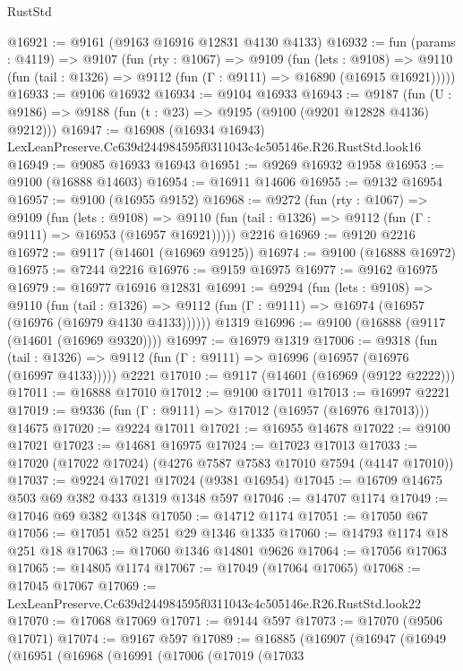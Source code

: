 \begin{lexlean}{RustStd}
\begin{coremodule}
@16921 := @9161 (@9163 @16916 @12831 @4130 @4133)
@16932 := fun (params : @4119) =>
  @9107
    (fun (rty : @1067) =>
    @9109
      (fun (lets : @9108) =>
      @9110 (fun (tail : @1326) => @9112 (fun (Γ : @9111) => @16890 (@16915 @16921)))))
@16933 := @9106 @16932
@16934 := @9104 @16933
@16943 := @9187
    (fun (U : @9186) => @9188 (fun (t : @23) => @9195 (@9100 (@9201 @12828 @4136) @9212)))
@16947 := @16908
    (@16934 @16943)
    LexLeanPreserve.Cc639d244984595f0311043c4c505146e.R26.RustStd.look16
@16949 := @9085 @16933 @16943
@16951 := @9269 @16932 @1958
@16953 := @9100 (@16888 @14603)
@16954 := @16911 @14606
@16955 := @9132 @16954
@16957 := @9100 (@16955 @9152)
@16968 := @9272
    (fun (rty : @1067) =>
    @9109
      (fun (lets : @9108) =>
      @9110 (fun (tail : @1326) => @9112 (fun (Γ : @9111) => @16953 (@16957 @16921)))))
    @2216
@16969 := @9120 @2216
@16972 := @9117 (@14601 (@16969 @9125))
@16974 := @9100 (@16888 @16972)
@16975 := @7244 @2216
@16976 := @9159 @16975
@16977 := @9162 @16975
@16979 := @16977 @16916 @12831
@16991 := @9294
    (fun (lets : @9108) =>
    @9110
      (fun (tail : @1326) =>
      @9112 (fun (Γ : @9111) => @16974 (@16957 (@16976 (@16979 @4130 @4133))))))
    @1319
@16996 := @9100 (@16888 (@9117 (@14601 (@16969 @9320))))
@16997 := @16979 @1319
@17006 := @9318
    (fun (tail : @1326) => @9112 (fun (Γ : @9111) => @16996 (@16957 (@16976 (@16997 @4133)))))
    @2221
@17010 := @9117 (@14601 (@16969 (@9122 @2222)))
@17011 := @16888 @17010
@17012 := @9100 @17011
@17013 := @16997 @2221
@17019 := @9336 (fun (Γ : @9111) => @17012 (@16957 (@16976 @17013))) @14675
@17020 := @9224 @17011
@17021 := @16955 @14678
@17022 := @9100 @17021
@17023 := @14681 @16975
@17024 := @17023 @17013
@17033 := @17020 (@17022 @17024) (@4276 @7587 @7583 @17010 @7594 (@4147 @17010))
@17037 := @9224 @17021 @17024 (@9381 @16954)
@17045 := @16709 @14675 @503 @69 @382 @433 @1319 @1348 @597
@17046 := @14707 @1174
@17049 := @17046 @69 @382 @1348
@17050 := @14712 @1174
@17051 := @17050 @67
@17056 := @17051 @52 @251 @29 @1346 @1335
@17060 := @14793 @1174 @18 @251 @18
@17063 := @17060 @1346 @14801 @9626
@17064 := @17056 @17063
@17065 := @14805 @1174
@17067 := @17049 (@17064 @17065)
@17068 := @17045 @17067
@17069 := LexLeanPreserve.Cc639d244984595f0311043c4c505146e.R26.RustStd.look22
@17070 := @17068 @17069
@17071 := @9144 @597
@17073 := @17070 (@9506 @17071)
@17074 := @9167 @597
@17089 := @16885
    (@16907
      (@16947
        (@16949
          (@16951
            (@16968
              (@16991
                (@17006
                  (@17019
                    (@17033

\end{coremodule}
\end{lexlean}
